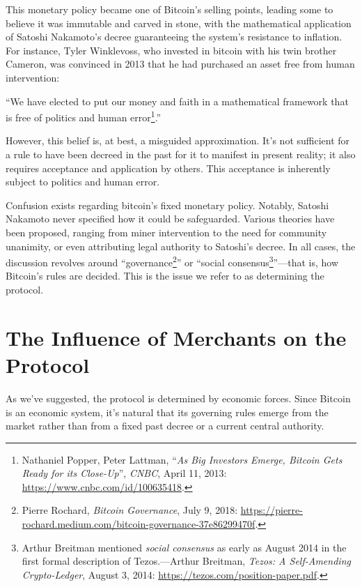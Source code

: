 \documentclass[
  a5paper,
  smalldemyvopaper,10pt,twoside,onecolumn,openright,extrafontsizes,hidelinks]{memoir}
\begin{document}
This monetary policy became one of Bitcoin's selling points, leading
some to believe it was immutable and carved in stone, with the
mathematical application of Satoshi Nakamoto's decree guaranteeing the
system's resistance to inflation. For instance, Tyler Winklevoss, who
invested in bitcoin with his twin brother Cameron, was convinced in 2013
that he had purchased an asset free from human intervention:

``We have elected to put our money and faith in a mathematical framework
that is free of politics and human error\footnote{Nathaniel Popper,
  Peter Lattman, ``\emph{As Big Investors Emerge, Bitcoin Gets Ready for
  its Close-Up}'', \emph{CNBC}, April 11, 2013:
  \url{https://www.cnbc.com/id/100635418}.}.''

However, this belief is, at best, a misguided approximation. It's not
sufficient for a rule to have been decreed in the past for it to
manifest in present reality; it also requires acceptance and application
by others. This acceptance is inherently subject to politics and human
error.

Confusion exists regarding bitcoin's fixed monetary policy. Notably,
Satoshi Nakamoto never specified how it could be safeguarded. Various
theories have been proposed, ranging from miner intervention to the need
for community unanimity, or even attributing legal authority to
Satoshi's decree. In all cases, the discussion revolves around
``governance\footnote{Pierre Rochard, \emph{Bitcoin Governance}, July 9,
  2018:
  \url{https://pierre-rochard.medium.com/bitcoin-governance-37e86299470f}.}''
or ``social consensus\footnote{Arthur Breitman mentioned \emph{social
  consensus} as early as August 2014 in the first formal description of
  Tezos.---Arthur Breitman, \emph{Tezos: A Self-Amending Crypto-Ledger},
  August 3, 2014: \url{https://tezos.com/position-paper.pdf}.}''---that
is, how Bitcoin's rules are decided. This is the issue we refer to as
determining the protocol.

\section*{The Influence of Merchants on the
Protocol}\label{the-influence-of-merchants-on-the-protocol}


As we've suggested, the protocol is determined by economic forces. Since
Bitcoin is an economic system, it's natural that its governing rules
emerge from the market rather than from a fixed past decree or a current
central authority.
\end{document}
